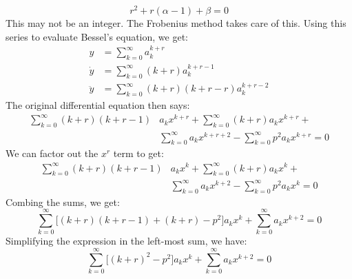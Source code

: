 \documentclass[crop=false,class=book,oneside]{standalone}
\begin{document}
        \begin{equation}
            r^{2}+r(\alpha-1)+\beta=0
        \end{equation}
        This may not be an integer. The Frobenius method takes care
        of this. Using this series to evaluate Bessel's equation,
        we get:
        \begin{subequations}
            \begin{align}
                y&=\sum_{k=0}^{\infty}a_{k}^{k+r}\\
                \dot{y}&=\sum_{k=0}^{\infty}(k+r)a_{k}^{k+r-1}\\
                \ddot{y}&=\sum_{k=0}^{\infty}(k+r)(k+r-r)a_{k}^{k+r-2}
            \end{align}
        \end{subequations}
        The original differential equation then says:
        \begin{equation}
            \begin{split}
                \sum_{k=0}^{\infty}(k+r)(k+r-1)&a_{k}x^{k+r}+
                \sum_{k=0}^{\infty}(k+r)a_{k}x^{k+r}+\\
                &\sum_{k=0}^{\infty}a_{k}x^{k+r+2}-
                \sum_{k=0}^{\infty}p^{2}a_{k}x^{k+r}=0
            \end{split}
        \end{equation}
        We can factor out the $x^{r}$ term to get:
        \begin{equation}
            \begin{split}
                \sum_{k=0}^{\infty}(k+r)(k+r-1)&a_{k}x^{k}+
                \sum_{k=0}^{\infty}(k+r)a_{k}x^{k}+\\
                &\sum_{k=0}^{\infty}a_{k}x^{k+2}-
                \sum_{k=0}^{\infty}p^{2}a_{k}x^{k}=0
            \end{split}
        \end{equation}
        Combing the sums, we get:
        \begin{equation}
            \sum_{k=0}^{\infty}\Big[(k+r)(k+r-1)+(k+r)-p^{2}\Big]
                a_{k}x^{k}+
            \sum_{k=0}^{\infty}a_{k}x^{k+2}=0
        \end{equation}
        Simplifying the expression in the left-most sum, we have:
        \begin{equation}
            \sum_{k=0}^{\infty}\Big[(k+r)^{2}-p^{2}\Big]
                a_{k}x^{k}+
            \sum_{k=0}^{\infty}a_{k}x^{k+2}=0
        \end{equation}
\end{document}
